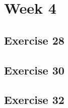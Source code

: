 \documentclass[a4paper]{article}
\let\stdsection\section
\renewcommand\section{\newpage\stdsection}
\begin{document}
\section*{Week 4}

\subsection*{Exercise 28}








\newpage
\subsection*{Exercise 30}


\newpage
\subsection*{Exercise 32}





\newpage
\end{document}
